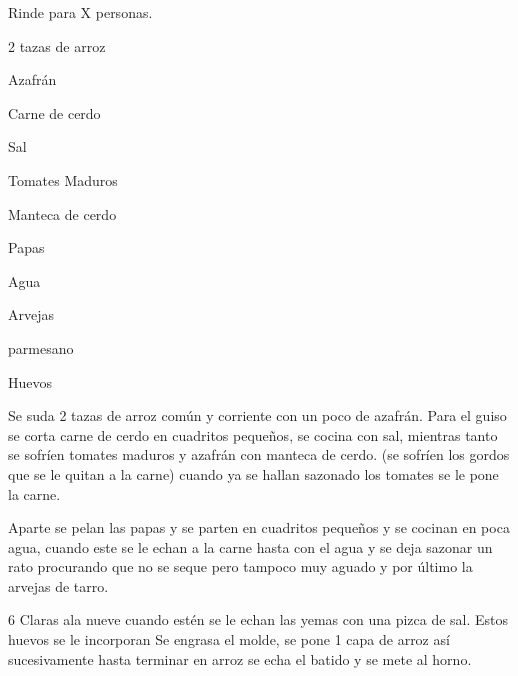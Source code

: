 
Rinde para X personas.


\begin{ingredientes}
\item 2 tazas de arroz
\item Azafrán
\item Carne de cerdo
\item Sal
\item Tomates Maduros
\item Manteca de cerdo
\item Papas
\item Agua
\item Arvejas
\item parmesano
\item Huevos
\end{ingredientes}
\preparacion

Se suda 2 tazas de arroz común y corriente con un poco de azafrán. Para el guiso se corta carne de cerdo en cuadritos pequeños, se cocina con sal, mientras tanto se sofríen tomates maduros y azafrán con manteca de cerdo. (se sofríen los gordos que se le quitan a la carne) cuando ya se hallan sazonado los tomates se le pone la carne.

Aparte se pelan las papas y se parten en cuadritos pequeños y se cocinan en poca agua, cuando este se le echan a la carne hasta con el agua y se deja sazonar un rato procurando que no se seque pero tampoco muy aguado y por último la arvejas de tarro.

6 Claras ala nueve cuando estén se le echan las yemas con una pizca de sal. Estos huevos se le incorporan  Se engrasa el molde, se pone 1 capa de arroz así sucesivamente hasta terminar en arroz se echa el batido y se mete al horno. 


